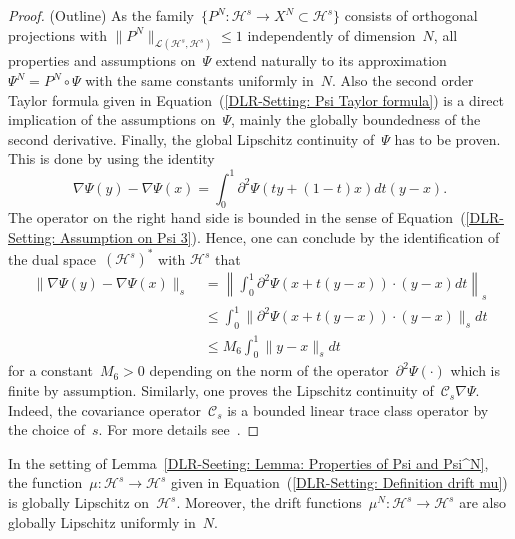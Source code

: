 \begin{proof}\autocite{Mattingly2010}(Outline)
 As the family~$\{ P^N: \mathcal{H}^s \to X^N \subset \mathcal{H}^s \}$ consists of orthogonal projections with $\| P^N \|_{\mathcal{L}(\mathcal{H}^s, \mathcal{H}^s)} \leq 1$ independently of dimension~$N$, all properties and assumptions on~$\Psi$ extend naturally to its approximation~$\Psi^N = P^N \circ \Psi$ with the same constants uniformly in~$N$. Also the second order Taylor formula given in Equation~(\ref{DLR-Setting: Psi Taylor formula}) is a direct implication of the assumptions on~$\Psi$, mainly the globally boundedness of the second derivative.  Finally, the global Lipschitz continuity of~$\Psi$ has to be proven. This is done by using the identity
 \begin{equation*}
  \nabla \Psi (y) - \nabla \Psi(x) = \int_0^1 \partial^2 \Psi (ty + (1-t)x) dt (y-x).
 \end{equation*}
 The operator on the right hand side is bounded in the sense of Equation~(\ref{DLR-Setting: Assumption on Psi 3}). Hence, one can conclude  by the identification of the dual space~$(\mathcal{H}^s)^*$ with $\mathcal{H}^s$ that
 \begin{equation*}
   \begin{split}
      \|  \nabla \Psi(y) - \nabla \Psi(x)  \|_s & \; =  \left\| \int_0^1 \partial^2 \Psi (x + t (y-x)) \cdot (y-x) dt \right\|_s \\
      & \; \leq \int_0^1 \| \partial^2 \Psi (x + t (y-x)) \cdot (y-x) \|_s dt \\
      & \; \leq M_6 \int_0^1 \| y -x \|_s dt 
   \end{split}
 \end{equation*}
 for a constant~$M_6>0$ depending on the norm of the operator~$\partial^2 \Psi(\cdot)$ which is finite by assumption. Similarly, one proves the Lipschitz continuity of~$\mathcal{C}_s \nabla \Psi$. Indeed, the covariance operator~$\mathcal{C}_s$ is a bounded linear trace class operator by the choice of~$s$. For more details see~\autocite[Lemma 3.3]{Mattingly2010}.
  
\end{proof}

\begin{cor}\autocite[Remark 2.5]{Pillai2012}
\label{DLR-Setting: Corollary: drifts are Lipschitz}
In the setting of Lemma~\ref{DLR-Seeting: Lemma: Properties of Psi and Psi^N}, the function~$\mu : \mathcal{H}^s \to \mathcal{H}^s$ given in Equation~(\ref{DLR-Setting: Definition drift mu}) is globally Lipschitz on~$\mathcal{H}^s$. Moreover, the drift functions~$\mu^N : \mathcal{H}^s \to \mathcal{H}^s$ are also globally Lipschitz uniformly in~$N$.
 
\end{cor}

